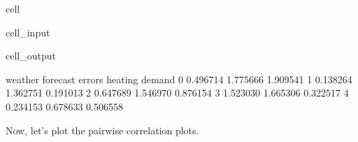 \documentclass[letterpaper,10pt,english]{jupyterBook}
\begin{document}
\begin{sphinxuseclass}{cell}
\begin{sphinxVerbatimInput}
\begin{sphinxuseclass}{cell_input}
\end{sphinxuseclass}\end{sphinxVerbatimInput}
\begin{sphinxVerbatimOutput}

\begin{sphinxuseclass}{cell_output}
\begin{sphinxVerbatim}[commandchars=\\\{\}]
    weather  forecast errors  heating demand
0  0.496714         1.775666        1.909541
1 \PYGZhy{}0.138264        \PYGZhy{}1.362751       \PYGZhy{}0.191013
2  0.647689         1.546970       \PYGZhy{}0.876154
3  1.523030         1.665306       \PYGZhy{}0.322517
4 \PYGZhy{}0.234153        \PYGZhy{}0.678633       \PYGZhy{}0.506558
\end{sphinxVerbatim}

\end{sphinxuseclass}\end{sphinxVerbatimOutput}

\end{sphinxuseclass}
\sphinxAtStartPar
Now, let’s plot the pairwise correlation plots.
\end{document}
